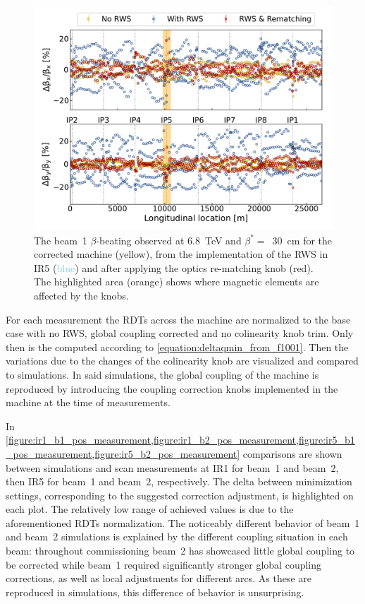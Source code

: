\begin{figure}[!htb]
    \centering
    \includegraphics*[width=\textwidth]{Figures/IR_Coupling_Correction/rematching_knob_efficiency.pdf}
    \caption{The beam~\num{1} \(\beta\)-beating observed at \qty{6.8}{\tera\electronvolt} and \(\beta^{*}=\)~\qty{30}{\centi\meter} for the corrected machine (\textcolor{butter}{yellow}), from the implementation of the RWS in IR\num{5} (\textcolor{skyblue}{blue}) and after applying the optics re-matching knob (\textcolor{scarletred}{red}). The highlighted area (\textcolor{highlightorange}{orange}) shows where magnetic elements are affected by the knobs.}
    \label{figure:ir5_rws_rematching}
\end{figure}

For each measurement the RDTs across the machine are normalized to the base case with no RWS, global coupling corrected and no colinearity knob trim.
Only then is the  computed according to \cref{equation:deltaqmin_from_f1001}.
Then the variations due to the changes of the colinearity knob are visualized and compared to simulations.
In said simulations, the global coupling of the machine is reproduced by introducing the coupling correction knobs implemented in the machine at the time of measurements.

In \cref{figure:ir1_b1_pos_measurement,figure:ir1_b2_pos_measurement,figure:ir5_b1_pos_measurement,figure:ir5_b2_pos_measurement} comparisons are shown between simulations and scan measurements at IR\num{1} for beam~\num{1} and beam~\num{2}, then IR\num{5} for beam~\num{1} and beam~\num{2}, respectively.
The delta between minimization settings, corresponding to the suggested correction adjustment, is highlighted on each plot.
The relatively low range of achieved  values is due to the aforementioned \glspl{RDT} normalization.
The noticeably different behavior of beam~\num{1} and beam~\num{2} simulations is explained by the different coupling situation in each beam: throughout commissioning beam~\num{2} has showcased little global coupling to be corrected while beam~\num{1} required significantly stronger global coupling corrections, as well as local adjustments for different arcs.
As these are reproduced in simulations, this difference of behavior is unsurprising.

